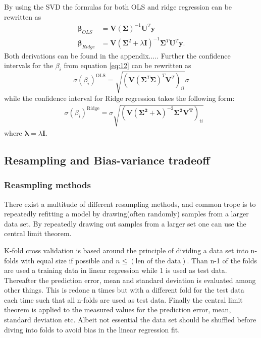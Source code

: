 \documentclass[uio,jmp,amsmath,amssymb,reprint,nofootinbib]{revtex4-1}
\numberwithin{equation}{section}
\newcommand{\lp}{\left(}
\newcommand{\rp}{\right)}
\begin{document}
By using the SVD the formulas for both OLS and ridge regression can be rewritten as
\begin{align}\label{eq:08}
\bm{\beta}_{OLS} &= \bm{V}(\bm{\Sigma})^{-1}\bm{U}^T\bm{y}\\ \label{eq:09}
\bm{\beta}_{Ridge} &= \bm{V}(\bm{\Sigma}^2 + \lambda\bm{I})^{-1}\bm{\Sigma}^T\bm{U}^T\bm{y}.
\end{align}
Both derivations can be found in the appendix..... Further the confidence intervals for the \(\beta_i\) from equation \ref{eq:12} can be rewritten as
\begin{equation}\label{eq:13}
\sigma(\beta_i)^{\text{OLS}} =\sqrt{ \lp\bm{V}\lp\bm{\Sigma}^T\bm{\Sigma}\rp^{T}\bm{V}^T\rp_{ii}}\sigma
\end{equation}
while the confidence interval for Ridge regression takes the following form:
\begin{align}\label{eq:14}
&\sigma(\beta_i)^{\text{Ridge}} = \sigma \sqrt{ \lp\bm{V}\lp \bm{\Sigma^2 + \lambda}\rp^{-2}\bm{\Sigma^2}\bm{V^T}\rp_{ii}}
\end{align}
where \(\bm{\lambda} = \lambda\bm{I}\).


\subsection{Resampling and Bias-variance tradeoff}

\subsubsection{Reasmpling methods}

There exist a multitude of different resampling methods, and common trope is to repeatedly refitting a model by drawing(often randomly) samples from a larger data set. By repeatedly drawing out samples from a larger set one can use the central limit theorem.  

K-fold cross validation is based around the principle of dividing a data set into n-folds with equal size if possible and \(n \leq (\text{len of the data})\). Than n-1 of the folds are used a training data in linear regression while 1 is used as test data. Thereafter the prediction error, mean and standard deviation is evaluated among other things. This is redone n times but with a different fold for the test data each time such that all n-folds are used as test data. Finally the central limit theorem is applied to the measured values for the prediction error, mean, standard deviation etc. Albeit not essential the data set should be shuffled before diving into folds to avoid bias in the linear regression fit.
\end{document}
